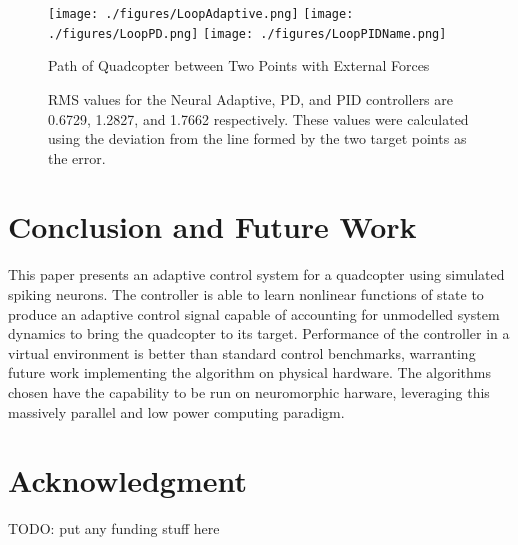\documentclass[letterpaper, 10 pt, conference]{ieeeconf}  %
\begin{document}
\begin{figure}
\centering
\texttt{[image: ./figures/LoopAdaptive.png]}
\texttt{[image: ./figures/LoopPD.png]}
\texttt{[image: ./figures/LoopPIDName.png]}
\caption{Path of Quadcopter between Two Points with External Forces}
\label{fig:loop_path}
\captionsetup{singlelinecheck=off,font=footnotesize}
\caption*{
RMS values for the Neural Adaptive, PD, and PID controllers are 0.6729, 1.2827, and 1.7662 respectively. These values were calculated using the deviation from the line formed by the two target points as the error.}
\end{figure}

\section{Conclusion and Future Work}

This paper presents an adaptive control system for a quadcopter using simulated spiking neurons.
The controller is able to learn nonlinear functions of state to produce an adaptive control signal capable of accounting for unmodelled system dynamics to bring the quadcopter to its target.
Performance of the controller in a virtual environment is better than standard control benchmarks, warranting future work implementing the algorithm on physical hardware.
The algorithms chosen have the capability to be run on neuromorphic harware, leveraging this massively parallel and low power computing paradigm.




\addtolength{\textheight}{-12cm}   %






\section*{Acknowledgment}

TODO: put any funding stuff here






\end{document}
